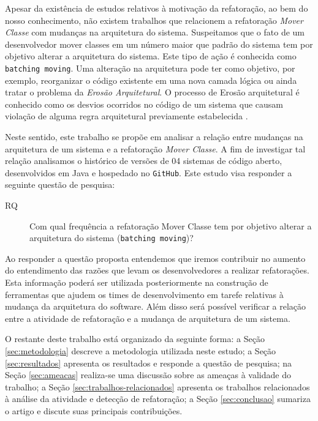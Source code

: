 \documentclass[12pt]{article}
\begin{document}
Apesar da existência de estudos relativos à motivação da refatoração, ao bem do nosso conhecimento, não existem trabalhos que relacionem a refatoração \textit{Mover Classe} com mudanças na arquitetura do sistema. Suspeitamos que o fato de um desenvolvedor mover classes em um número maior que padrão do sistema tem por objetivo alterar a arquitetura do sistema. Este tipo de ação é conhecida como \texttt{batching moving}. Uma alteração na arquitetura pode ter como objetivo, por exemplo, reorganizar o código existente em uma nova camada lógica ou ainda tratar o problema da  \textit{Erosão Arquitetural}. O processo de Erosão arquitetural é conhecido como os desvios ocorridos no código de um sistema que causam violação de alguma regra arquitetural previamente estabelecida \cite{Perry:1992:FSS:141874.141884}.

Neste sentido, este trabalho se propõe em analisar a relação entre mudanças na arquitetura de um sistema e a refatoração \textit{Mover Classe}. A fim de investigar tal relação analisamos o histórico de versões de 04 sistemas de código aberto, desenvolvidos em Java e hospedado no \texttt{GitHub}. Este estudo visa responder a seguinte questão de pesquisa:

\begin{description}
	\item[RQ] Com qual frequência a refatoração Mover Classe tem por objetivo alterar a arquitetura do sistema (\texttt{batching moving})?	
\end{description}

Ao responder a questão proposta entendemos que iremos contribuir no aumento do entendimento das razões que levam os desenvolvedores a realizar refatorações. Esta informação poderá ser utilizada posteriormente na construção de ferramentas que ajudem os times de desenvolvimento em tarefe relativas à mudança da arquitetura do software. Além disso será possível verificar a relação entre a atividade de refatoração e a mudança de arquitetura de um sistema. 

O restante deste trabalho está organizado da seguinte forma: a Seção \ref{sec:metodologia} descreve a metodologia utilizada neste estudo; a Seção \ref{sec:resultados} apresenta os resultados e responde a questão de pesquisa; na Seção \ref{sec:ameacas} realiza-se uma discussão sobre as ameaças à validade do trabalho; a Seção \ref{sec:trabalhos-relacionados} apresenta os trabalhos relacionados à análise da atividade e detecção de refatoração; a Seção \ref{sec:conclusao} sumariza o artigo e discute suas principais contribuições.
\end{document}
